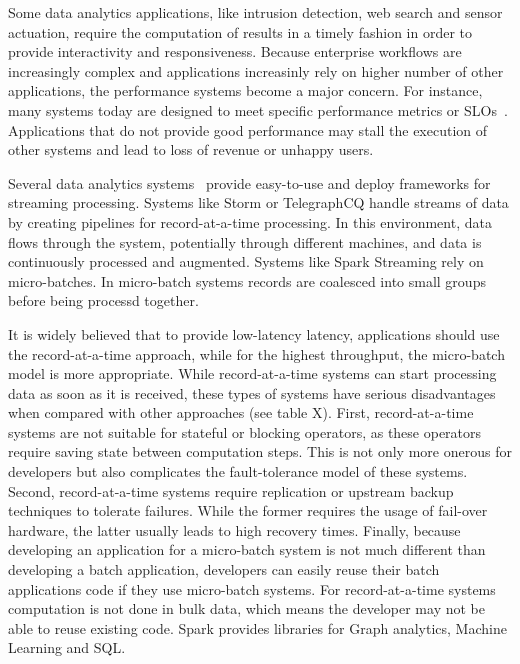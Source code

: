 Some data analytics applications, like intrusion detection, web search and sensor actuation, require the computation of results in a timely fashion in order to provide interactivity and responsiveness. 
Because enterprise workflows are increasingly complex and applications increasinly rely on higher number of other applications, the performance systems become a major concern.
For instance, many systems today are designed to meet specific performance metrics or SLOs~\cite{Jockey}.
Applications that do not provide good performance may stall the execution of other systems and lead to loss of revenue or unhappy users.

Several data analytics 
systems~\cite{Babu:2001:CQO:603867.603884,TelegraphCQ,Storm,SparkStreaming,Trill,Naiad,Niagara,StreamInsight,Carney:2002:MSN:1287369.1287389,Sullivan:1998:TSM:1268256.1268258,Condie:2010:MO:1855711.185573,Brito:2011:SLD:2114498.2116192} 
provide easy-to-use and deploy frameworks for streaming processing.
Systems like Storm or TelegraphCQ handle streams of data by creating pipelines for record-at-a-time processing. In this environment, data flows through the system, potentially through different machines, and data is continuously processed and augmented.
Systems like Spark Streaming rely on micro-batches. In micro-batch systems records are coalesced into small groups before being processd together.

It is widely believed that to provide low-latency latency, applications should use the record-at-a-time approach, while for the highest throughput, the micro-batch model is more appropriate. 
While record-at-a-time systems can start processing data as soon as it is received, these types of systems have serious disadvantages when compared with other approaches (see table X).
First, record-at-a-time systems are not suitable for stateful or blocking operators, as these operators require saving state between computation steps. This is not only more onerous for developers but also complicates the fault-tolerance model of these systems.
Second, record-at-a-time systems require replication or upstream backup techniques to tolerate failures.
While the former requires the usage of fail-over hardware, the latter usually leads to high recovery times.
Finally, because developing an application for a micro-batch system is not much different than developing a batch application, developers can easily reuse their batch applications code if they use micro-batch systems. For record-at-a-time systems computation is not done in bulk data, which means the developer may not be able to reuse existing code.
Spark provides libraries for Graph analytics, Machine Learning and SQL.

